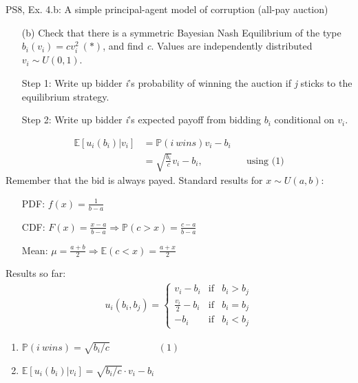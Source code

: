 \begin{frame}{PS8, Ex. 4.b: A simple principal-agent model of corruption (all-pay auction)}
    \begin{itemize}
      \item[(b)] Check that there is a symmetric Bayesian Nash Equilibrium of the type $b_i(v_i) = cv_i^2\ (*)$, and find \textit{c}. Values are independently distributed $v_i\sim U(0, 1)$.
    \end{itemize} \vspace{-8pt}
    \begin{multicols}{2}
      \begin{itemize}
        \item[Step 1:] Write up bidder \textit{i}'s probability of winning the auction if \textit{j} sticks to the equilibrium strategy.
        \item[Step 2:] Write up bidder \textit{i}'s expected payoff from bidding $b_i$ conditional on $v_i$.
      \end{itemize} \vspace{-8pt}
      \begin{align*}
        \mathbb{E}[u_i(b_i)|v_i]&=\mathbb{P}(i\ wins)v_i-b_i\\
                           &=\sqrt{\frac{b_i}{c}}v_i-b_i,&&\text{using (1)}
      \end{align*} \vspace{-8pt}
      Remember that the bid is always payed.
      \vfill\null\columnbreak
      Standard results for $x\sim U(a, b):$ \vspace{-6pt}
      \begin{itemize}
        \item[PDF:] $f(x)=\frac{1}{b-a}$
        \item[CDF:] $F(x)=\frac{x-a}{b-a}\Rightarrow\mathbb{P}(c>x)=\frac{c-a}{b-a}$
        \item[Mean:] $\mu=\frac{a+b}{2}\Rightarrow\mathbb{E}(c<x)=\frac{a+x}{2}$
      \end{itemize}
      \vspace{-6pt}
      Results so far: \vspace{-6pt}
      \begin{align*}
        u_i(b_i,b_j)=\left\{\begin{array}{lcl}
          v_i-b_i           & \text{if} & b_i>b_j \\
          \frac{v_i}{2}-b_i & \text{if} & b_i=b_j \\
          -b_i              & \text{if} & b_i<b_j
        \end{array}\right.
      \end{align*} \vspace{-16pt}
      \begin{enumerate}
        \item $\mathbb{P}(i\ wins)=\sqrt{b_i/c}\quad\quad\quad\quad\quad(1)$
        \item $\mathbb{E}[u_i(b_i)|v_i]=\sqrt{b_i/c}\cdot v_i-b_i$
      \end{enumerate}
      \vfill\null
    \end{multicols}
\end{frame}
